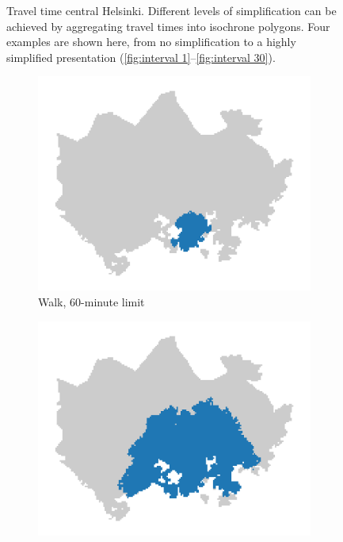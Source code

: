 \begin{figure}[H]
\begin{subfigure}[b]{0.4\textwidth}
	\end{subfigure}%
	\caption{
		Travel time central Helsinki.
		Different levels of simplification can be achieved by
		aggregating travel times into isochrone polygons.
		Four examples are shown here, from no simplification
		to a highly simplified presentation (\ref{fig:interval 1}--\ref{fig:interval 30}).
	}
	\label{fig:isochrone intervals}
\end{figure}

\begin{figure}[H]
	\centering
	\begin{subfigure}[b]{0.5\textwidth}
		\includegraphics[width=\textwidth]{visual/figures/ttm/tt_limit_walk}
		\caption{Walk, 60-minute limit}
		\label{fig:limit walk}
	\end{subfigure}%
	\hfill
	\begin{subfigure}[b]{0.5\textwidth}
		\includegraphics[width=\textwidth]{visual/figures/ttm/tt_limit_bike}

\end{subfigure}
\end{figure}
